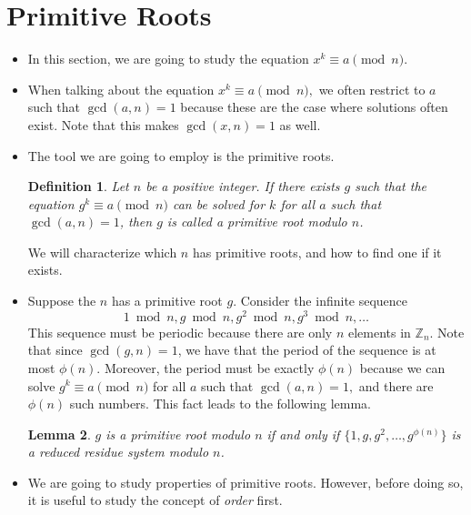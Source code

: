 \documentclass{article}
\newtheorem{lemma}{Lemma}[section]
\newtheorem{definition}[lemma]{Definition}
\begin{document}
  \section{Primitive Roots} %
  \label{sec:primitive_roots}
    \begin{itemize}
      \item In this section, we are going to study the equation $x^k \equiv a \pmod{n}$.
        
      \item When talking about the equation $x^k \equiv a \pmod{n},$ we often restrict
        to $a$ such that $\gcd(a,n) = 1$ because these are the case where solutions often
        exist. Note that this makes $\gcd(x,n) = 1$ as well.
        
      \item  The tool we are going to employ is the primitive roots.
        \begin{definition}
          Let $n$ be a positive integer. If there exists $g$ such that the equation
          $g^k \equiv a \pmod{n}$ can be solved for $k$ for all $a$ such that $\gcd(a,n) =1$,
          then $g$ is called a \emph{primitive root modulo $n$}.
        \end{definition}
        
        We will characterize which $n$ has primitive roots, and how to find one
        if it exists.
        
      \item Suppose the $n$ has a primitive root $g$. Consider the infinite sequence
        $$1 \bmod n, g \bmod n, g^2 \bmod n, g^3 \bmod n, \dotsc$$ 
        This sequence must be periodic because there are only $n$ elements
        in $\mathbb{Z}_n$. Note that since $\gcd(g, n) = 1$, we have that the period
        of the sequence is at most $\phi(n)$. Moreover, the period must be
        exactly $\phi(n)$ because we can solve $g^k \equiv a \pmod{n}$ for
        all $a$ such that $\gcd(a,n) = 1,$ and there are $\phi(n)$ such numbers.
        This fact leads to the following lemma.
        
        \begin{lemma}
          $g$ is a primitive root modulo $n$ if and only if $\{ 1, g, g^2, \dotsc, g^{\phi(n)} \}$
          is a reduced residue system modulo $n$.
        \end{lemma}
        
      \item We are going to study properties of primitive roots. However, before
        doing so, it is useful to study the concept of \emph{order} first.
        

\end{itemize}
\end{document}
